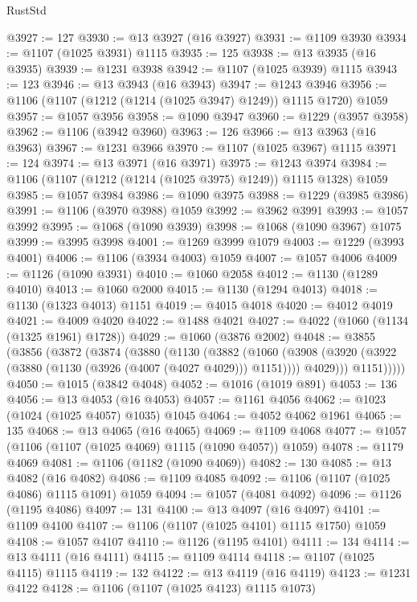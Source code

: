 \begin{lexlean}{RustStd}
\begin{coremodule}
@3927 := 127
@3930 := @13 @3927 (@16 @3927)
@3931 := @1109 @3930
@3934 := @1107 (@1025 @3931) @1115
@3935 := 125
@3938 := @13 @3935 (@16 @3935)
@3939 := @1231 @3938
@3942 := @1107 (@1025 @3939) @1115
@3943 := 123
@3946 := @13 @3943 (@16 @3943)
@3947 := @1243 @3946
@3956 := @1106 (@1107 (@1212 (@1214 (@1025 @3947) @1249)) @1115 @1720) @1059
@3957 := @1057 @3956
@3958 := @1090 @3947
@3960 := @1229 (@3957 @3958)
@3962 := @1106 (@3942 @3960)
@3963 := 126
@3966 := @13 @3963 (@16 @3963)
@3967 := @1231 @3966
@3970 := @1107 (@1025 @3967) @1115
@3971 := 124
@3974 := @13 @3971 (@16 @3971)
@3975 := @1243 @3974
@3984 := @1106 (@1107 (@1212 (@1214 (@1025 @3975) @1249)) @1115 @1328) @1059
@3985 := @1057 @3984
@3986 := @1090 @3975
@3988 := @1229 (@3985 @3986)
@3991 := @1106 (@3970 @3988) @1059
@3992 := @3962 @3991
@3993 := @1057 @3992
@3995 := @1068 (@1090 @3939)
@3998 := @1068 (@1090 @3967) @1075
@3999 := @3995 @3998
@4001 := @1269 @3999 @1079
@4003 := @1229 (@3993 @4001)
@4006 := @1106 (@3934 @4003) @1059
@4007 := @1057 @4006
@4009 := @1126 (@1090 @3931)
@4010 := @1060 @2058
@4012 := @1130 (@1289 @4010)
@4013 := @1060 @2000
@4015 := @1130 (@1294 @4013)
@4018 := @1130 (@1323 @4013) @1151
@4019 := @4015 @4018
@4020 := @4012 @4019
@4021 := @4009 @4020
@4022 := @1488 @4021
@4027 := @4022 (@1060 (@1134 (@1325 @1961) @1728))
@4029 := @1060 (@3876 @2002)
@4048 := @3855
    (@3856
      (@3872
        (@3874
          (@3880
            (@1130
              (@3882
                (@1060
                  (@3908
                    (@3920 (@3922 (@3880 (@1130 (@3926 (@4007 (@4027 @4029))) @1151))))
                    @4029)))
              @1151)))))
@4050 := @1015 (@3842 @4048)
@4052 := @1016 (@1019 @891)
@4053 := 136
@4056 := @13 @4053 (@16 @4053)
@4057 := @1161 @4056
@4062 := @1023 (@1024 (@1025 @4057) @1035) @1045
@4064 := @4052 @4062 @1961
@4065 := 135
@4068 := @13 @4065 (@16 @4065)
@4069 := @1109 @4068
@4077 := @1057 (@1106 (@1107 (@1025 @4069) @1115 (@1090 @4057)) @1059)
@4078 := @1179 @4069
@4081 := @1106 (@1182 (@1090 @4069))
@4082 := 130
@4085 := @13 @4082 (@16 @4082)
@4086 := @1109 @4085
@4092 := @1106 (@1107 (@1025 @4086) @1115 @1091) @1059
@4094 := @1057 (@4081 @4092)
@4096 := @1126 (@1195 @4086)
@4097 := 131
@4100 := @13 @4097 (@16 @4097)
@4101 := @1109 @4100
@4107 := @1106 (@1107 (@1025 @4101) @1115 @1750) @1059
@4108 := @1057 @4107
@4110 := @1126 (@1195 @4101)
@4111 := 134
@4114 := @13 @4111 (@16 @4111)
@4115 := @1109 @4114
@4118 := @1107 (@1025 @4115) @1115
@4119 := 132
@4122 := @13 @4119 (@16 @4119)
@4123 := @1231 @4122
@4128 := @1106 (@1107 (@1025 @4123) @1115 @1073)

\end{coremodule}
\end{lexlean}
